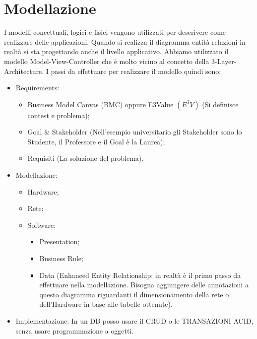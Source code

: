 \section{Modellazione}

I modelli concettuali, logici e fisici vengono utilizzati per descrivere come realizzare delle applicazioni. Quando si realizza il diagramma entità relazioni in realtà si sta progettando anche il livello applicativo. Abbiamo utilizzato il modello Model-View-Controller che è molto vicino al concetto della 3-Layer-Architecture.  I passi da effettuare per realizzare il modello quindi sono:

\begin{itemize}

\item{Requirements}:

\begin{itemize}

\item Business Model Canvas (BMC) oppure E3Value $(E^3V)$ (Si definisce contest e problema);
\item Goal \& Stakeholder (Nell’esempio universitario gli Stakeholder sono lo Studente, il Professore e il Goal è la Laurea);
\item Requisiti (La soluzione del problema).
\end{itemize}

\item{Modellazione}:

\begin{itemize}

\item Hardware;
\item Rete;
\item Software:

\begin{itemize}

\item Presentation;
\item Business Rule;
\item Data (Enhanced Entity Relationship: in realtà è il primo passo da effettuare nella modellazione. Bisogna aggiungere delle annotazioni a questo diagramma riguardanti il dimensionamento della rete o dell’Hardware in base alle tabelle ottenute).
\end{itemize}

\end{itemize}

\item{Implementazione}: In un DB posso usare il CRUD o le TRANSAZIONI ACID, senza usare programmazione a oggetti. 

\end{itemize}


